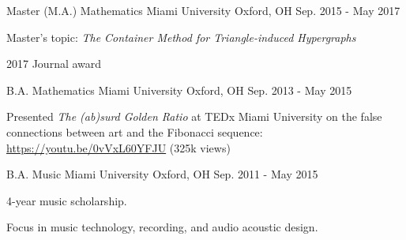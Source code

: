 

\begin{cventries}

  \cventry
    {Master (M.A.) Mathematics} %
    {Miami University} %
    {Oxford, OH} %
    {Sep. 2015 - May 2017} %
    {
      \begin{cvitems} %
        \item {Master's topic: {\it The Container Method for Triangle-induced Hypergraphs}}
        \item {2017 Journal award}
      \end{cvitems}
    }

  \cventry
    {B.A. Mathematics} %
    {Miami University} %
    {Oxford, OH} %
    {Sep. 2013 - May 2015} %
    {
      \begin{cvitems} %
      \item {Presented {\it The (ab)surd Golden Ratio} at TEDx Miami
          University on the false connections between art and the
          Fibonacci sequence: \url{https://youtu.be/0vVxL60YFJU} (325k views)}
      \end{cvitems}
    }

  \cventry
    {B.A. Music} %
    {Miami University} %
    {Oxford, OH} %
    {Sep. 2011 - May 2015} %
    {
      \begin{cvitems} %
        \item {4-year music scholarship.}
        \item {Focus in music technology, recording, and audio acoustic design.}
      \end{cvitems}
    }
\end{cventries}
